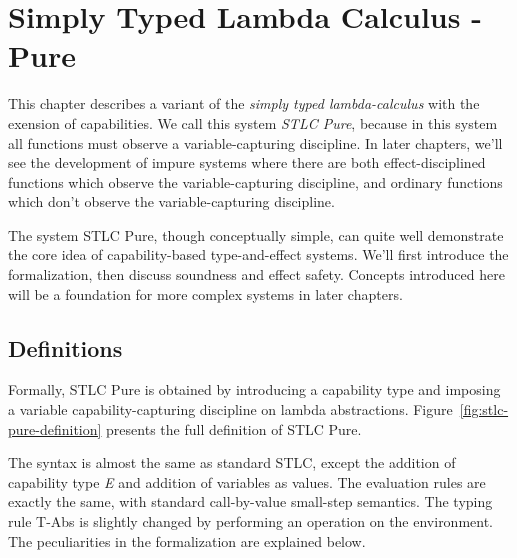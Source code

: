 \section{Simply Typed Lambda Calculus - Pure}

This chapter describes a variant of the \emph{simply typed
  lambda-calculus} with the exension of capabilities. We call this
system \emph{STLC Pure}, because in this system all functions must
observe a variable-capturing discipline.  In later chapters, we'll see
the development of impure systems where there are both
effect-disciplined functions which observe the variable-capturing
discipline, and ordinary functions which don't observe the
variable-capturing discipline.

The system STLC Pure, though conceptually simple, can quite well
demonstrate the core idea of capability-based type-and-effect
systems. We'll first introduce the formalization, then discuss
soundness and effect safety. Concepts introduced here will be a
foundation for more complex systems in later chapters.

\subsection{Definitions}

Formally, STLC Pure is obtained by introducing a capability type and
imposing a variable capability-capturing discipline on lambda
abstractions.  Figure~\ref{fig:stlc-pure-definition} presents the full
definition of STLC Pure.

The syntax is almost the same as standard STLC, except the addition of
capability type \emph{E} and addition of variables as values. The
evaluation rules are exactly the same, with standard call-by-value
small-step semantics. The typing rule T-Abs is slightly changed by
performing an operation on the environment. The peculiarities in the
formalization are explained below.

